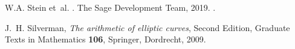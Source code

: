 \documentclass[12pt]{amsart}
\numberwithin{equation}{section}
\theoremstyle{definition}
\theoremstyle{remark}
\begin{document}
\begin{thebibliography}{999}
W.\thinspace{}A. Stein et~al.
.
\newblock The Sage Development Team, 2019.
.

 J.\ H. Silverman,
{\em The arithmetic of elliptic curves},
Second Edition, Graduate Texts in Mathematics {\bf 106}, Springer, Dordrecht, 2009.



\end{thebibliography}
\end{document}

